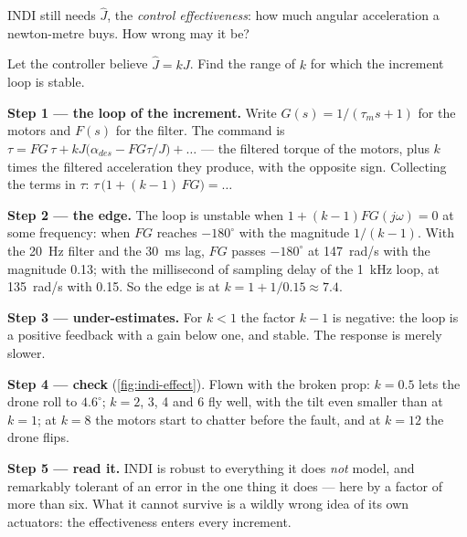 INDI still needs $\hat J$, the \emph{control effectiveness}: how much angular acceleration a newton-metre buys. How wrong may it be?

\begin{example}
\label{ex:indi-effect}
Let the controller believe $\hat J = kJ$. Find the range of $k$ for which the increment loop is stable.

\textbf{Step 1 — the loop of the increment.} Write $G(s) = 1/(\tau_ms + 1)$ for the motors and $F(s)$ for the filter. The command is $\tau = F G\,\tau + kJ\big(\alpha_{des} - FG\tau/J\big) + \dots$ — the filtered torque of the motors, plus $k$ times the filtered acceleration they produce, with the opposite sign. Collecting the terms in $\tau$: $\tau\,\big(1 + (k - 1)\,FG\big) = \dots$

\textbf{Step 2 — the edge.} The loop is unstable when $1 + (k - 1)FG(j\omega) = 0$ at some frequency: when $FG$ reaches $-180^\circ$ with the magnitude $1/(k - 1)$. With the \SI{20}{Hz} filter and the \SI{30}{ms} lag, $FG$ passes $-180^\circ$ at \SI{147}{rad/s} with the magnitude 0.13; with the millisecond of sampling delay of the \SI{1}{kHz} loop, at \SI{135}{rad/s} with 0.15. So the edge is at $k = 1 + 1/0.15 \approx 7.4$.

\textbf{Step 3 — under-estimates.} For $k < 1$ the factor $k - 1$ is negative: the loop is a positive feedback with a gain below one, and stable. The response is merely slower.

\textbf{Step 4 — check} (\cref{fig:indi-effect}). Flown with the broken prop: $k = 0.5$ lets the drone roll to $4.6^\circ$; $k = 2$, 3, 4 and 6 fly well, with the tilt even smaller than at $k = 1$; at $k = 8$ the motors start to chatter before the fault, and at $k = 12$ the drone flips.

\textbf{Step 5 — read it.} INDI is robust to everything it does \emph{not} model, and remarkably tolerant of an error in the one thing it does — here by a factor of more than six. What it cannot survive is a wildly wrong idea of its own actuators: the effectiveness enters every increment.
\end{example}


